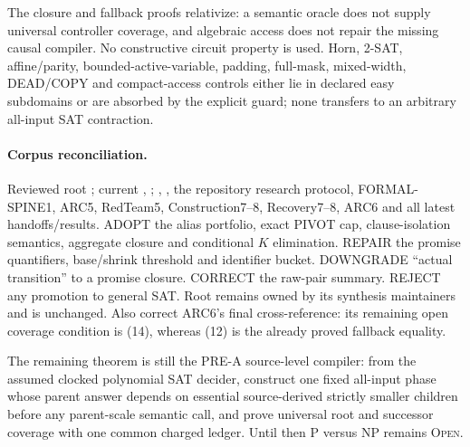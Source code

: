 \documentclass[11pt]{article}
\begin{document}
The closure and fallback proofs relativize: a semantic oracle does not
supply universal controller coverage, and algebraic access does not repair
the missing causal compiler.  No constructive circuit property is used.
Horn, 2-SAT, affine/parity, bounded-active-variable, padding, full-mask,
mixed-width, DEAD/COPY and compact-access controls either lie in declared
easy subdomains or are absorbed by the explicit guard; none transfers to an
arbitrary all-input SAT contraction.

\paragraph{Corpus reconciliation.}
Reviewed root ; current , ;
, , the repository research protocol,
FORMAL-SPINE1, ARC5, RedTeam5, Construction7--8, Recovery7--8, ARC6 and all
latest handoffs/results.  ADOPT the alias portfolio, exact PIVOT cap,
clause-isolation semantics, aggregate closure and conditional $K$
elimination.  REPAIR the promise quantifiers, base/shrink threshold and
identifier bucket.  DOWNGRADE ``actual transition'' to a promise closure.
CORRECT the raw-pair summary.  REJECT any promotion to general SAT.  Root
 remains owned by its synthesis maintainers and is unchanged.
Also correct ARC6's final cross-reference: its remaining open coverage
condition is (14), whereas (12) is the already proved fallback equality.

The remaining theorem is still the PRE-A source-level compiler: from the
assumed clocked polynomial SAT decider, construct one fixed all-input phase
whose parent answer depends on essential source-derived strictly smaller
children before any parent-scale semantic call, and prove universal root and
successor coverage with one common charged ledger.  Until then P versus NP
remains \textsc{Open}.

\end{document}
